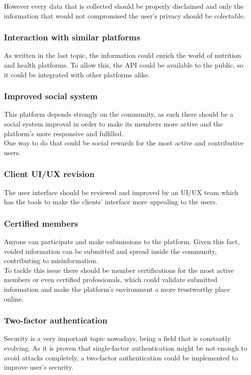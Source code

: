 However every data that is collected should be properly disclaimed and only the information that
would not compromised the user's privacy should be colectable.

\subsubsection{Interaction with similar platforms}

As written in the last topic, the information could enrich the world of nutrition and health platforms.
To allow this, the API could be available to the public, so it could be integrated with other platforms
alike.\\

\subsubsection{Improved social system}

This platform depends strongly on the community, as such there should be a social system improval in order
to make its members more active and the platform's more responsive and fulfilled.\\

One way to do that could be social rewards for the most active and contributive users.

\subsubsection{Client UI/UX revision}

The user interface should be reviewed and improved by an UI/UX team which has the tools to make the clients' 
interface more appealing to the users.

\subsubsection{Certified members}

Anyone can participate and make submissions to the platform. Given this fact, voided information
can be submitted and spread inside the community, contributing to misinformation.\\

To tackle this issue there should be member certifications for the most active members or even
certified professionals, which could validate submitted information and make the platform's
environment a more trustworthy place online.

\subsubsection{Two-factor authentication}

Security is a very important topic nowadays, being a field that is constantly evolving. As it is proven
that single-factor authentication might be not enough to avoid attacks completely, a two-factor authentication
could be implemented to improve user's security.

